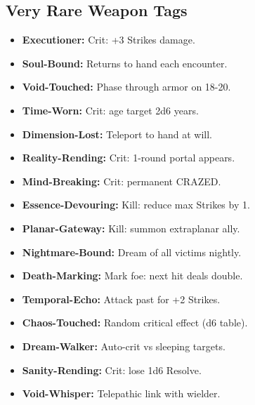 \documentclass[10pt,twoside]{article}
\begin{document}
\vspace{0.5cm}

\subsection{Very Rare Weapon Tags}
\begin{minipage}[t]{0.48\textwidth}
\begin{itemize}[leftmargin=0.3cm, itemsep=0.1cm]
\item \textcolor{veryrarecolor}{\textbf{Executioner:}} \textcolor{veryrarecolor}{Crit: +3 Strikes damage.}
\item \textcolor{veryrarecolor}{\textbf{Soul-Bound:}} \textcolor{veryrarecolor}{Returns to hand each encounter.}
\item \textcolor{veryrarecolor}{\textbf{Void-Touched:}} \textcolor{veryrarecolor}{Phase through armor on 18-20.}
\item \textcolor{veryrarecolor}{\textbf{Time-Worn:}} \textcolor{veryrarecolor}{Crit: age target 2d6 years.}
\item \textcolor{veryrarecolor}{\textbf{Dimension-Lost:}} \textcolor{veryrarecolor}{Teleport to hand at will.}
\item \textcolor{veryrarecolor}{\textbf{Reality-Rending:}} \textcolor{veryrarecolor}{Crit: 1-round portal appears.}
\item \textcolor{veryrarecolor}{\textbf{Mind-Breaking:}} \textcolor{veryrarecolor}{Crit: permanent CRAZED.}
\item \textcolor{veryrarecolor}{\textbf{Essence-Devouring:}} \textcolor{veryrarecolor}{Kill: reduce max Strikes by 1.}
\item \textcolor{veryrarecolor}{\textbf{Planar-Gateway:}} \textcolor{veryrarecolor}{Kill: summon extraplanar ally.}
\item \textcolor{veryrarecolor}{\textbf{Nightmare-Bound:}} \textcolor{veryrarecolor}{Dream of all victims nightly.}
\item \textcolor{veryrarecolor}{\textbf{Death-Marking:}} \textcolor{veryrarecolor}{Mark foe: next hit deals double.}
\item \textcolor{veryrarecolor}{\textbf{Temporal-Echo:}} \textcolor{veryrarecolor}{Attack past for +2 Strikes.}
\item \textcolor{veryrarecolor}{\textbf{Chaos-Touched:}} \textcolor{veryrarecolor}{Random critical effect (d6 table).}
\item \textcolor{veryrarecolor}{\textbf{Dream-Walker:}} \textcolor{veryrarecolor}{Auto-crit vs sleeping targets.}
\item \textcolor{veryrarecolor}{\textbf{Sanity-Rending:}} \textcolor{veryrarecolor}{Crit: lose 1d6 Resolve.}
\item \textcolor{veryrarecolor}{\textbf{Void-Whisper:}} \textcolor{veryrarecolor}{Telepathic link with wielder.}
\end{itemize}
\end{minipage}
\end{document}
